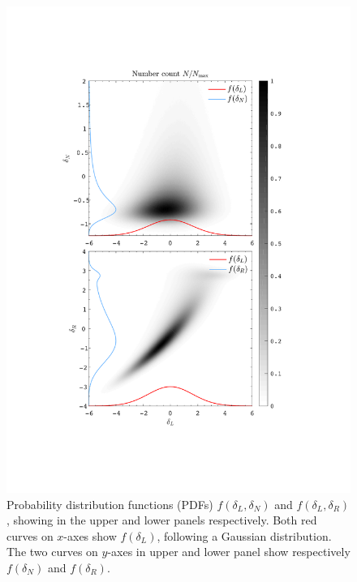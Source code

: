 \documentclass[aps,prd,twocolumn,superscriptaddress,amsfont,amssymb,amsmath,nofootinbib,showpacs,balancelastpage]{revtex4-1}
\begin{document}
\begin{figure}[t] \centering
  \includegraphics[width=1.0\linewidth]{pdfs.pdf}
  \caption{Probability distribution functions (PDFs)
  $f(\delta_L,\delta_N)$ and $f(\delta_L,\delta_R)$, showing in the upper
  and lower panels respectively. Both red curves on $x$-axes show $f(\delta_L)$, following
  a Gaussian distribution. The two curves on $y$-axes in upper and lower panel
  show respectively $f(\delta_N)$ and $f(\delta_R)$.}
  \label{fig.pdfs}
\end{figure}
\end{document}
